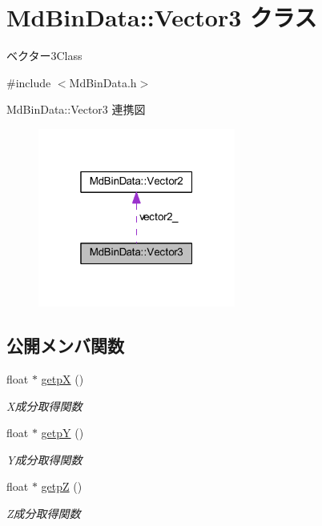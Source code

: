 \hypertarget{class_md_bin_data_1_1_vector3}{}\section{Md\+Bin\+Data\+:\+:Vector3 クラス}
\label{class_md_bin_data_1_1_vector3}


ベクター3\+Class  




{\ttfamily \#include $<$Md\+Bin\+Data.\+h$>$}



Md\+Bin\+Data\+:\+:Vector3 連携図
\nopagebreak
\begin{figure}[H]
\begin{center}
\leavevmode
\includegraphics[width=184pt]{class_md_bin_data_1_1_vector3__coll__graph}
\end{center}
\end{figure}
\subsection*{公開メンバ関数}
\begin{DoxyCompactItemize}
\item 
float $\ast$ \mbox{\hyperlink{class_md_bin_data_1_1_vector3_a92662563dc33035c94d457cd96d7972e}{getpX}} ()
\begin{DoxyCompactList}\small\item\em X成分取得関数 \end{DoxyCompactList}\item 
float $\ast$ \mbox{\hyperlink{class_md_bin_data_1_1_vector3_aaf3534a3038219e74875d002255e0c27}{getpY}} ()
\begin{DoxyCompactList}\small\item\em Y成分取得関数 \end{DoxyCompactList}\item 
float $\ast$ \mbox{\hyperlink{class_md_bin_data_1_1_vector3_a3f0b7ef217f5a065fa86aa3da983b6a4}{getpZ}} ()
\begin{DoxyCompactList}\small\item\em Z成分取得関数 \end{DoxyCompactList}\end{DoxyCompactItemize}
